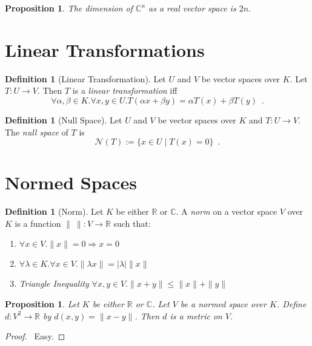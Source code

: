 \documentclass{book}
\let\qed\relax
\newtheorem{prop}[ax]{Proposition}
\theoremstyle{definition}
\newtheorem{df}[ax]{Definition}
\begin{document}
\begin{prop}
The dimension of $\mathbb{C}^n$ as a real vector space is $2n$.
\end{prop}

\section{Linear Transformations}

\begin{df}[Linear Transformation]
Let $U$ and $V$ be vector spaces over $K$. Let $T : U \rightarrow V$. Then $T$ is a \emph{linear transformation} iff
\[ \forall \alpha, \beta \in K. \forall x,y \in U. T(\alpha x + \beta y) = \alpha T(x) + \beta T(y) \enspace . \]
\end{df}

\begin{df}[Null Space]
Let $U$ and $V$ be vector spaces over $K$ and $T : U \rightarrow V$. The \emph{null space} of $T$ is
\[ \mathcal{N}(T) := \{ x \in U \mid T(x) = 0 \} \enspace . \]
\end{df}

\section{Normed Spaces}

\begin{df}[Norm]
Let $K$ be either $\mathbb{R}$ or $\mathbb{C}$.
A \emph{norm} on a vector space $V$ over $K$ is a function $\| \ \| : V \rightarrow \mathbb{R}$ such that:
\begin{enumerate}
\item $\forall x \in V. \| x \| = 0 \Rightarrow x = 0$
\item $\forall \lambda \in K. \forall x \in V. \| \lambda x \| = |\lambda| \| x \|$
\item \emph{Triangle Inequality} $\forall x,y \in V. \| x + y \| \leq \| x \| + \| y \|$
\end{enumerate}
\end{df}

\begin{prop}
Let $K$ be either $\mathbb{R}$ or $\mathbb{C}$. Let $V$ be a normed space over $K$. Define $d : V^2 \rightarrow \mathbb{R}$ by $d(x,y) = \| x-y \|$. Then $d$ is a metric on $V$.
\end{prop}

\begin{proof}
\pf\ Easy. \qed
\end{proof}
\end{document}
